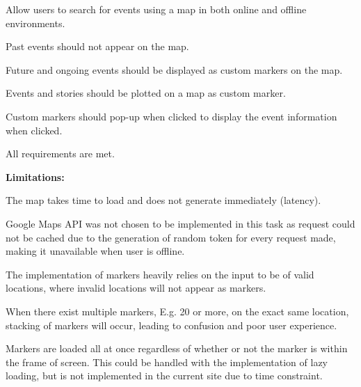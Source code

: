 \documentclass[11pt, a4paper]{article}
\begin{document}
\begin{enumerate*}[label=\textbf{\arabic*})]
\item Allow users to search for events using a map in both online and offline environments.
\item Past events should not appear on the map.
\item Future and ongoing events should be displayed as custom markers on the map.
\item Events and stories should be plotted on a map as custom marker.
\item Custom markers should pop-up when clicked to display the event information when clicked.
\item All requirements are met.
\end{enumerate*}
%
\textbf{Limitations:}
\begin{enumerate*}[label=\textbf{\arabic*})]
\item The map takes time to load and does not generate immediately (latency).
\item Google Maps API was not chosen to be implemented in this task as request could not be cached
due to the generation of random token for every request made, making it unavailable when user is
offline.
\item The implementation of markers heavily relies on the input to be of valid locations, where
invalid locations will not appear as markers.
\item When there exist multiple markers, E.g. 20 or more, on the exact same location, stacking of
markers will occur, leading to confusion and poor user experience.
\item Markers are loaded all at once regardless of whether or not the marker is within the frame of
screen. This could be handled with the implementation of lazy loading, but is not implemented in the
current site due to time constraint.
\end{enumerate*}
\end{document}
